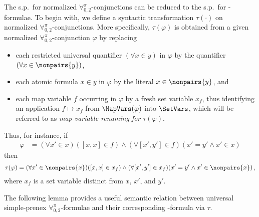 \documentclass[submission,copyright,creativecommons]{eptcs}
\newcommand{\Lang}{\ensuremath{\mathbf{\forall}^{\pi}_{0,2}}\xspace}
\newcommand{\svx}{x}
\newcommand{\svy}{y}
\newcommand{\mvx}{f}
\newcommand{\corr}[1]{#1}
\begin{document}
The s.p.\ for normalized \Lang-conjunctions can be reduced to the
s.p.\ for \Forallpizero-formulae.  To begin with, we define a
syntactic transformation $\tau(\cdot)$ on normalized
\Lang-conjunctions.  More specifically, $\tau(\varphi)$ is obtained
from a given normalized \Lang-conjunction $\varphi$ by replacing
\begin{itemize}
    \item each restricted universal quantifier $(\forall x \in y)$ in
    $\varphi$ \corr{by} the quantifier $(\forall x \in \nonpairs{y})$,
    
    \item each atomic formula $x \in y$ in $\varphi$ \corr{by} the literal
    $x \in \nonpairs{y}$, and
    
    \item each map variable $\mvx$ occurring in $\varphi$ by a fresh
    set variable $\svx_{\mvx}$, thus identifying an application $\mvx
    \mapsto \svx_\mvx$ from $\MapVars(\varphi)$ into $\SetVars$, 
    which will be referred to as \emph{\corr{map-variable renaming} for 
    $\tau(\varphi)$}.
\end{itemize}    
Thus, for instance, if
\begin{align*}
\varphi &= (\forall \svx' \in \svx)([\svx,\svx] \in \mvx)
\wedge (\forall [\svx',\svy'] \in \mvx)(\svx'=\svy' \wedge \svx' \in
\svx)
\end{align*}
then
\[
\tau(\varphi) = (\forall \svx' \in \nonpairs{\svx})([\svx,\svx] \in
\svx_{\mvx}) \wedge (\forall [\svx',\svy'] \in
\svx_{\mvx})(\svx'=\svy' \wedge \svx' \in \nonpairs{\svx})\,,
\]
where $\svx_{\mvx}$ is a set variable distinct from $\svx$, $\svx'$, 
and $\svy'$.

The following lemma
provides a useful semantic relation between universal
simple-prenex \Lang-formulae and their corresponding
\Forallpizero-formula via $\tau$.
\end{document}
